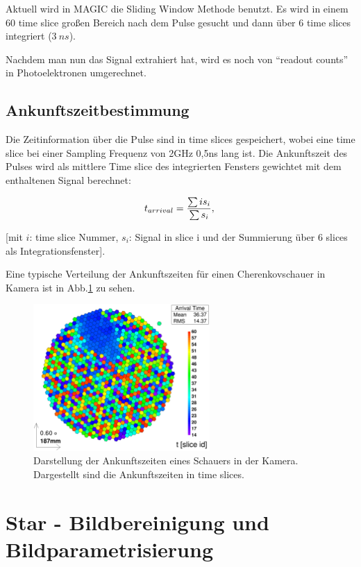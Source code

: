 Aktuell wird in MAGIC die Sliding Window Methode benutzt. Es wird in einem 60 time slice großen Bereich nach dem Pulse gesucht und dann über 6 time slices integriert ($\SI{3}{ns}$).

Nachdem man nun das Signal extrahiert hat, wird es noch von ``readout counts'' in Photoelektronen umgerechnet.

\subsection{Ankunftszeitbestimmung}
Die Zeitinformation über die Pulse sind in time slices gespeichert, wobei eine time slice bei einer Sampling Frequenz von 2GHz 0,5ns lang ist.
Die Ankunftszeit des Pulses wird als mittlere Time slice des integrierten Fensters gewichtet mit dem enthaltenen Signal berechnet:

\begin{equation}
 t_{arrival}=\frac{\sum i s_i}{\sum s_i},\\
\end{equation}
\begin{center}
\small{[mit $i$: time slice Nummer, $s_i$: Signal in slice i und der Summierung über 6 slices als Integrationsfenster].}
\end{center}


Eine typische Verteilung der Ankunftszeiten für einen Cherenkovschauer in Kamera ist in Abb.\ref{Kamera-Bild-ArrivalTimes} zu sehen.

\begin{figure}
    \centering
    \includegraphics[width=0.6\textwidth]{./Plots/03_MonteCarlos/Signal_ArrivalTime_fertig.png}
    \caption{Darstellung der Ankunftszeiten eines Schauers in der Kamera. Dargestellt sind die Ankunftszeiten in time slices.}
    \label{Kamera-Bild-ArrivalTimes}
\end{figure}

\section{Star - Bildbereinigung und Bildparametrisierung}
\label{sec:Star-ImageCleaning}

